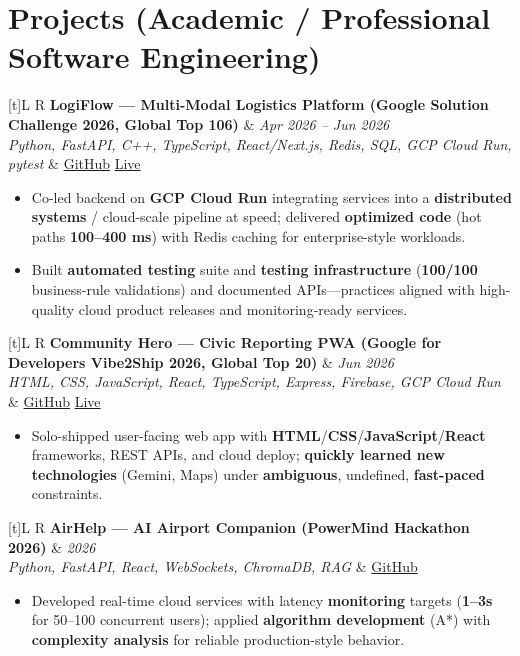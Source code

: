 \documentclass[a4paper,10pt]{article}
\newcommand{\resumeProject}[4]{%
  \vspace{0.4mm}
  \noindent
  \begin{tabularx}{\textwidth}[t]{L R}
    \textbf{#1} & \textit{#3} \\
    \textit{#2} & #4 \\
  \end{tabularx}
  \vspace{-0.4mm}%
}
\begin{document}
\section{Projects (Academic / Professional Software Engineering)}
\small

\resumeProject
  {LogiFlow --- Multi-Modal Logistics Platform (Google Solution Challenge 2026, Global Top 106)}
  {Python, FastAPI, C++, TypeScript, React/Next.js, Redis, SQL, GCP Cloud Run, pytest}
  {Apr 2026 -- Jun 2026}
  {\href{https://github.com/Ojas-Srivastava05/LogiFlow-Solution-Challenge-2026}{GitHub} \textbar{} \href{https://logi-flow-solution-challenge-2026.vercel.app/}{Live}}
\begin{itemize}
  \item Co-led backend on \textbf{GCP Cloud Run} integrating services into a \textbf{distributed systems} / cloud-scale pipeline at speed; delivered \textbf{optimized code} (hot paths \textbf{100--400 ms}) with Redis caching for enterprise-style workloads.
  \item Built \textbf{automated testing} suite and \textbf{testing infrastructure} (\textbf{100/100} business-rule validations) and documented APIs---practices aligned with high-quality cloud product releases and monitoring-ready services.
\end{itemize}

\resumeProject
  {Community Hero --- Civic Reporting PWA (Google for Developers Vibe2Ship 2026, Global Top 20)}
  {HTML, CSS, JavaScript, React, TypeScript, Express, Firebase, GCP Cloud Run}
  {Jun 2026}
  {\href{https://github.com/Ojas-Srivastava05/community-hero}{GitHub} \textbar{} \href{https://community-hero-987477089222.asia-south1.run.app}{Live}}
\begin{itemize}
  \item Solo-shipped user-facing web app with \textbf{HTML}/\textbf{CSS}/\textbf{JavaScript}/\textbf{React} frameworks, REST APIs, and cloud deploy; \textbf{quickly learned new technologies} (Gemini, Maps) under \textbf{ambiguous}, undefined, \textbf{fast-paced} constraints.
\end{itemize}

\resumeProject
  {AirHelp --- AI Airport Companion (PowerMind Hackathon 2026)}
  {Python, FastAPI, React, WebSockets, ChromaDB, RAG}
  {2026}
  {\href{https://github.com/Ojas-Srivastava05/AirHelp-AI-Airport-Assistant}{GitHub}}
\begin{itemize}
  \item Developed real-time cloud services with latency \textbf{monitoring} targets (\textbf{1--3s} for 50--100 concurrent users); applied \textbf{algorithm development} (A*) with \textbf{complexity analysis} for reliable production-style behavior.
\end{itemize}
\end{document}
